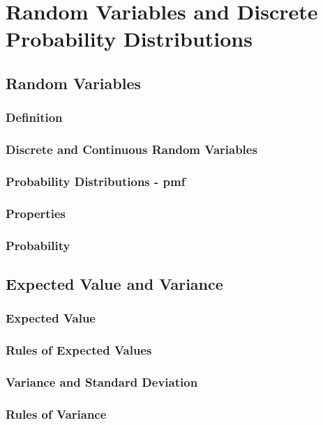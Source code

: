 \documentclass{report}
\begin{document}
\chapter{Random Variables and Discrete Probability Distributions}  %
    \section{Random Variables}  %
        \subsection{Definition}  %
        \subsection{Discrete and Continuous Random Variables}  %
        \subsection{Probability Distributions - pmf}  %
        \subsection{Properties}  %
        \subsection{Probability}  %

    \section{Expected Value and Variance}  %
        \subsection{Expected Value}  %
        \subsection{Rules of Expected Values}  %
        \subsection{Variance and Standard Deviation}  %
        \subsection{Rules of Variance}  %
\end{document}

